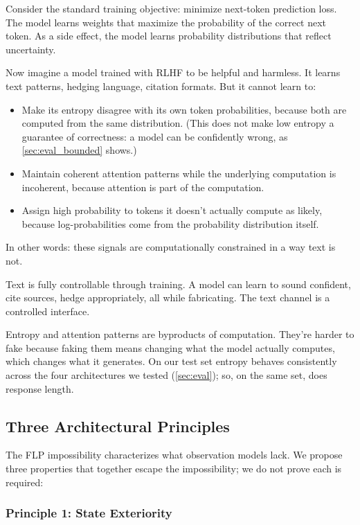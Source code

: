 \documentclass[11pt]{article}
\begin{document}
Consider the standard training objective: minimize next-token prediction loss. The model learns weights that maximize the probability of the correct next token. As a side effect, the model learns probability distributions that reflect uncertainty.

Now imagine a model trained with RLHF to be helpful and harmless. It learns text patterns, hedging language, citation formats. But it cannot learn to:
\begin{itemize}
    \item Make its entropy disagree with its own token probabilities, because both are computed from the same distribution. (This does not make low entropy a guarantee of correctness: a model can be confidently wrong, as \autoref{sec:eval_bounded} shows.)
    \item Maintain coherent attention patterns while the underlying computation is incoherent, because attention is part of the computation.
    \item Assign high probability to tokens it doesn't actually compute as likely, because log-probabilities come from the probability distribution itself.
\end{itemize}

In other words: these signals are computationally constrained in a way text is not.

Text is fully controllable through training. A model can learn to sound confident, cite sources, hedge appropriately, all while fabricating. The text channel is a controlled interface.

Entropy and attention patterns are byproducts of computation. They're harder to fake because faking them means changing what the model actually computes, which changes what it generates. On our test set entropy behaves consistently across the four architectures we tested (\autoref{sec:eval}); so, on the same set, does response length.

\subsection{Three Architectural Principles}

The FLP impossibility characterizes what observation models lack. We propose three properties that together escape the impossibility; we do not prove each is required:

\subsubsection{Principle 1: State Exteriority}
\end{document}
